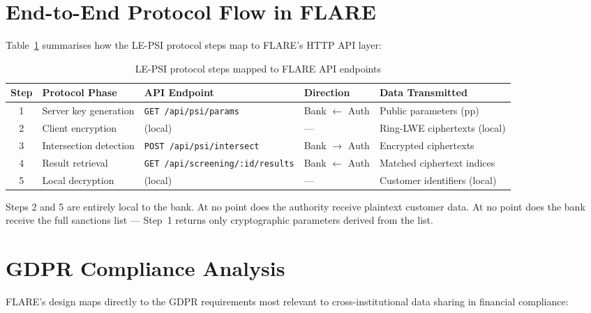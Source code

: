 \section{End-to-End Protocol Flow in FLARE}

Table~\ref{tab:e2e-flow} summarises how the LE-PSI protocol steps map to FLARE's
HTTP API layer:

\begin{table}[H]
\centering
\caption{LE-PSI protocol steps mapped to FLARE API endpoints}
\label{tab:e2e-flow}
\begin{tabular}{@{}cllll@{}}
\toprule
\textbf{Step} & \textbf{Protocol Phase} & \textbf{API Endpoint} & \textbf{Direction} & \textbf{Data Transmitted} \\
\midrule
1 & Server key generation  & \texttt{GET /api/psi/params}      & Bank $\leftarrow$ Auth & Public parameters (pp) \\
2 & Client encryption      & (local)                           & ---                & Ring-LWE ciphertexts (local) \\
3 & Intersection detection & \texttt{POST /api/psi/intersect}  & Bank $\to$ Auth    & Encrypted ciphertexts \\
4 & Result retrieval       & \texttt{GET /api/screening/:id/results} & Bank $\leftarrow$ Auth  & Matched ciphertext indices \\
5 & Local decryption       & (local)                           & ---                & Customer identifiers (local) \\
\bottomrule
\end{tabular}
\end{table}

Steps 2 and 5 are entirely local to the bank. At no point does the authority
receive plaintext customer data. At no point does the bank receive the full
sanctions list --- Step~1 returns only cryptographic parameters derived from the list.

\section{GDPR Compliance Analysis}

FLARE's design maps directly to the GDPR requirements most relevant to
cross-institutional data sharing in financial compliance:

